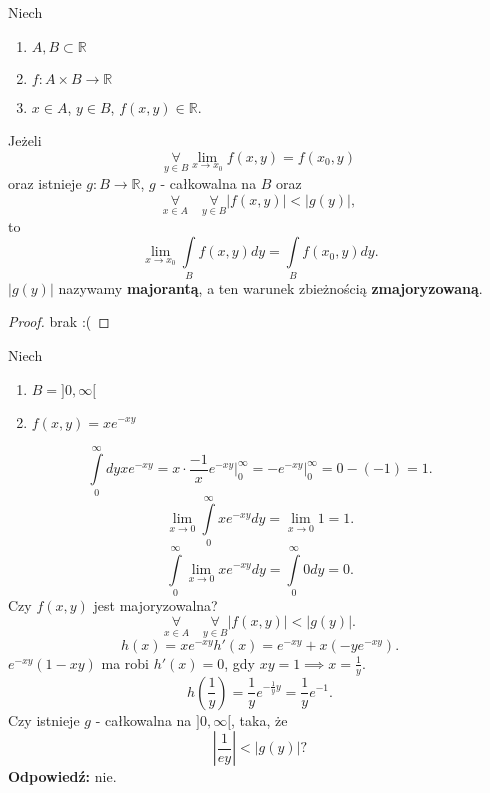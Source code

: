 \documentclass[../main.tex]{subfiles}
\begin{document}
\begin{tw}
    Niech
    \begin{enumerate}
        \item $A, B \subset \mathbb{R}$
        \item $f: A \times B \to \mathbb{R}$
        \item $x\in A$, $y\in B$, $f(x,y)\in \mathbb{R}$.
    \end{enumerate}
    Jeżeli
    \[
        \underset{y\in B}{\forall} \lim\limits_{x\to x_0}f(x,y) = f(x_0,y)
    \]
    oraz istnieje $g: B\to \mathbb{R}$, $g$ - całkowalna na $B$ oraz
    \[
        \underset{x\in A}{\forall}\quad \underset{y\in B}{\forall} \left| f(x,y) \right| < \left| g(y) \right|
    ,\]
to
\[
    \lim_{x \to x_0}\int\limits_{B}f(x,y)dy = \int\limits_{B}f(x_0,y)dy
.\]
$|g(y)|$ nazywamy \textbf{majorantą}, a ten warunek zbieżnością \textbf{zmajoryzowaną}.
\end{tw}
\begin{proof}
    brak :(
\end{proof}
\begin{przyklad}
    Niech
    \begin{enumerate}
        \item $B = ]0,\infty[$
        \item $f(x,y) = xe^{-xy}$
    \end{enumerate}
    \[
        \int\limits_{0}^{\infty} dy xe^{-xy} = x\cdot \frac{-1}{x} e^{-xy}\Bigg|_{0}^{\infty} = -e^{-xy}\Bigg|_{0}^{\infty} = 0 - (-1) = 1
    .\]
\[
    \lim_{x \to 0} \int\limits_{0}^{\infty} xe^{-xy}dy = \lim_{x \to 0}1 = 1
.\]
\[
    \int\limits_{0}^{\infty} \lim_{x \to 0}xe^{-xy}dy = \int\limits_{0}^{\infty} 0 dy = 0
.\]
Czy $f(x,y)$ jest majoryzowalna?
\[
    \underset{x\in A}{\forall} \quad\underset{y\in B}{\forall} \left| f(x,y) \right| < \left| g(y) \right|
.\]
\[
    h(x) = xe^{-xy}h'(x) = e^{-xy} + x\left( -y e^{-xy} \right)
.\]
$e^{-xy}(1-xy)$ ma robi  $h'(x) = 0$, gdy $xy = 1 \implies x = \frac{1}{y}$.
\[
    h\left(\frac{1}{y}\right) = \frac{1}{y}e^{-\frac{1}{y}y} = \frac{1}{y}e^{-1}
.\]
Czy istnieje $g$ - całkowalna na $]0,\infty[$, taka, że
\[
    \left| \frac{1}{ey} \right| < \left| g(y) \right| ?
\]
\textbf{Odpowiedź:} nie.
\end{przyklad}
\end{document}
